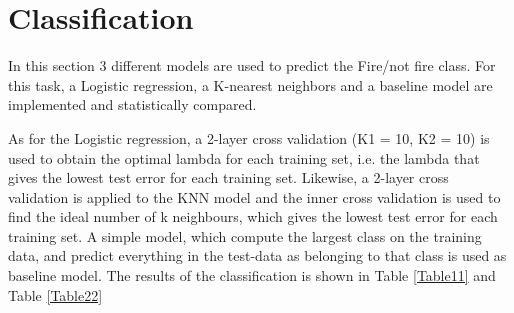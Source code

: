 \documentclass[10pt]{article}
\numberwithin{equation}{section}
\numberwithin{figure}{section}
\numberwithin{table}{section}
\begin{document}
\section{Classification}
In this section 3 different models are used to predict the Fire/not fire class.
For this task, a Logistic regression, a K-nearest neighbors and a baseline model are implemented and statistically compared.

As for the Logistic regression, a 2-layer cross validation (K1 = 10, K2 = 10) is used to obtain the optimal lambda for each training set, i.e. the lambda that gives the lowest test error for each training set.
Likewise, a 2-layer cross validation is applied to the KNN model and the inner cross validation is used to find the ideal number of k neighbours, which gives the lowest test error for each training set.
A simple model, which compute the largest class on the training
data, and predict everything in the test-data as belonging to that class is used as baseline model.
The results of the classification is shown in Table \ref{Table11} and Table \ref{Table22}
\end{document}
